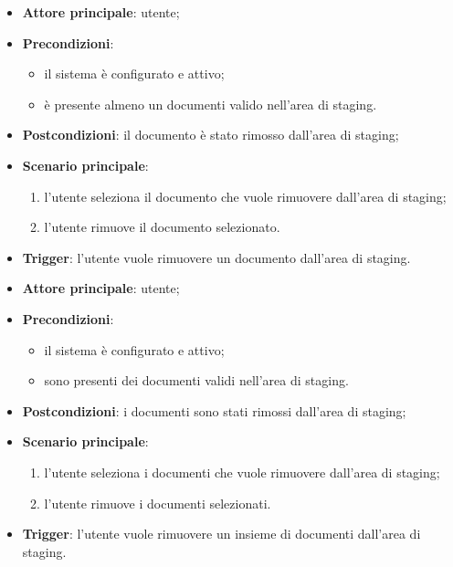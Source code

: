 \documentclass[10pt, a4paper]{article}
\begin{document}
    \begin{itemize}
        \item \textbf{Attore principale}: utente;
        \item \textbf{Precondizioni}:
            \begin{itemize}
                \item il sistema è configurato e attivo;
                \item è presente almeno un documenti valido nell’area di staging.
            \end{itemize}
        \item \textbf{Postcondizioni}: il documento è stato rimosso dall’area di staging;
        \item \textbf{Scenario principale}: 
            \begin{enumerate}
                \item l’utente seleziona il documento che vuole rimuovere dall’area di staging;
                \item l’utente rimuove il documento selezionato.
            \end{enumerate}
        \item \textbf{Trigger}: l’utente vuole rimuovere un documento dall’area di staging.
    \end{itemize}

    \begin{itemize}
        \item \textbf{Attore principale}: utente;
        \item \textbf{Precondizioni}:
            \begin{itemize}
                \item il sistema è configurato e attivo;
                \item sono presenti dei documenti validi nell’area di staging.
            \end{itemize}
        \item \textbf{Postcondizioni}: i documenti sono stati rimossi dall’area di staging;
        \item \textbf{Scenario principale}: 
            \begin{enumerate}
                \item l’utente seleziona i documenti che vuole rimuovere dall’area di staging;
                \item l’utente rimuove i documenti selezionati.
            \end{enumerate}
        \item \textbf{Trigger}: l’utente vuole rimuovere un insieme di documenti dall’area di staging.
    \end{itemize}
\end{document}
